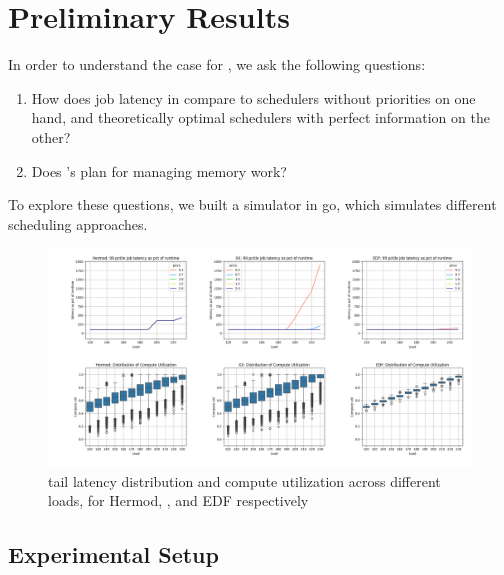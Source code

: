 \section{Preliminary Results}



In order to understand the case for \sys{}, we ask the following questions: 
\begin{enumerate}
    \item How does job latency in \sys{} compare to schedulers without
    priorities on one hand, and theoretically optimal schedulers with perfect
    information on the other?
    \item Does \sys{}'s plan for managing memory work?
\end{enumerate}


To explore these questions, we built a simulator in go\cite{golang}, which
simulates different scheduling approaches.

\begin{figure}[t!]
    \centering
      \includegraphics[width=16cm]{img/hermod_xx_edf_latencies.png}
      \caption{ tail latency distribution and compute utilization across
      different loads, for Hermod, \sys{}, and EDF respectively }
    \label{fig:hermod-xx-edf}
\end{figure}


\subsection{Experimental Setup}

